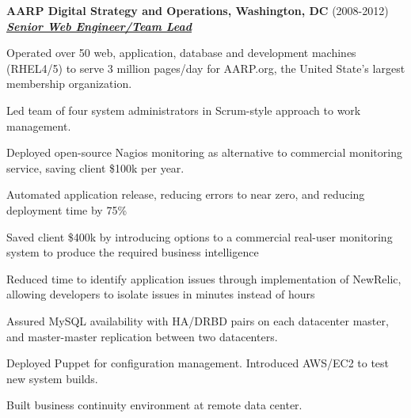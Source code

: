 \documentclass{article}
\newcommand{\employer}[3]{{ \textbf{#1} (#2)\\ \underline{\textbf{\emph{#3}}}\\ \nopagebreak }}
\newenvironment{achievements}{\begin{list}{\topsep 0pt \itemsep -2pt}} {\vspace*{4pt}\end{list}}
\begin{document}
\employer{AARP Digital Strategy and Operations, Washington, DC}{2008-2012}{Senior Web Engineer/Team Lead}
\begin{achievements}
  \item Operated over 50 web, application, database and development machines (RHEL4/5) to serve 3 million pages/day for AARP.org, the United State's largest membership organization.
  \item Led team of four system administrators in Scrum-style approach to work management.
  \item Deployed open-source Nagios monitoring as alternative to commercial monitoring service, saving client \$100k per year.
  \item Automated application release, reducing errors to near zero, and reducing deployment time by 75\%
  \item Saved client \$400k by introducing options to a commercial real-user monitoring system to produce the required business intelligence
  \item Reduced time to identify application issues through implementation of NewRelic, allowing developers to isolate issues in minutes instead of hours
  \item Assured MySQL availability with HA/DRBD pairs on each datacenter master, and master-master replication between two datacenters.
  \item Deployed Puppet for configuration management. Introduced AWS/EC2 to test new system builds.
  \item Built business continuity environment at remote data center.


\end{achievements}
\end{document}
